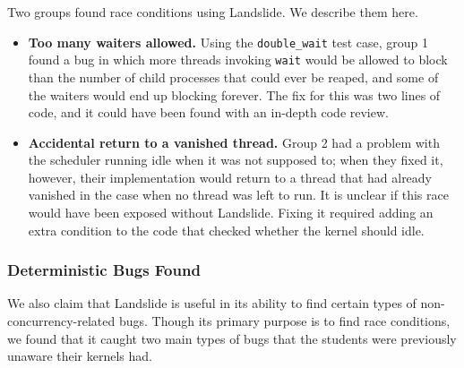 Two groups found race conditions using Landslide. We describe them here.

\begin{itemize}
	\item {\bf Too many waiters allowed.} Using the \texttt{double\_wait} test case, group 1 found a bug in which more threads invoking \texttt{wait} would be allowed to block than the number of child processes that could ever be reaped, and some of the waiters would end up blocking forever. The fix for this was two lines of code, and it could have been found with an in-depth code review.
	\item {\bf Accidental return to a vanished thread.} Group 2 had a problem with the scheduler running idle when it was not supposed to; when they fixed it, however, their implementation would return to a thread that had already vanished in the case when no thread was left to run. It is unclear if this race would have been exposed without Landslide. Fixing it required adding an extra condition to the code that checked whether the kernel should idle.
\end{itemize}



\subsubsection{Deterministic Bugs Found}

We also claim that Landslide is useful in its ability to find certain types of non-concurrency-related bugs. Though its primary purpose is to find race conditions, we found that it caught two main types of bugs that the students were previously unaware their kernels had.

